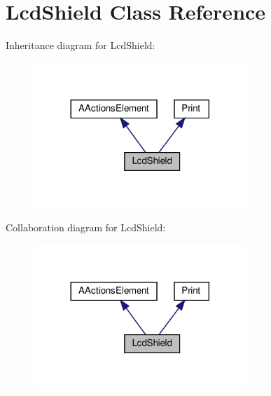 \hypertarget{classLcdShield}{}\section{Lcd\+Shield Class Reference}
\label{classLcdShield}


Inheritance diagram for Lcd\+Shield\+:
\nopagebreak
\begin{figure}[H]
\begin{center}
\leavevmode
\includegraphics[width=228pt]{classLcdShield__inherit__graph}
\end{center}
\end{figure}


Collaboration diagram for Lcd\+Shield\+:
\nopagebreak
\begin{figure}[H]
\begin{center}
\leavevmode
\includegraphics[width=228pt]{classLcdShield__coll__graph}
\end{center}
\end{figure}
